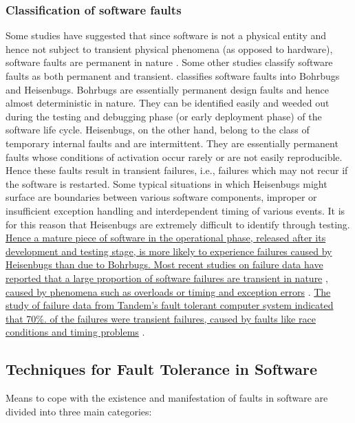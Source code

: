 \documentclass[a4paper, 11pt]{article}
\begin{document}

\subsubsection{Classification of software faults}
Some studies have suggested that since software is not a physical entity and hence not subject to transient physical phenomena (as opposed to hardware), software faults are permanent in nature \citep{huang1994two}. Some other studies classify software faults as both permanent and transient. \citet{gray1986computers} classifies software faults into Bohrbugs and Heisenbugs. Bohrbugs are essentially permanent design faults and hence almost deterministic in nature. They can be identified easily and weeded out during the testing and debugging phase (or early deployment phase) of the software life cycle. Heisenbugs, on the other hand, belong to the class of temporary internal faults and are intermittent. They are essentially permanent faults whose conditions of activation occur rarely or are not easily reproducible. Hence these faults result in transient failures, i.e., failures which may not recur if the software is restarted. Some typical situations in which Heisenbugs might surface are boundaries between various software components, improper or insufficient exception handling and interdependent timing of various events. It is for this reason that Heisenbugs are extremely difficult to identify through testing. \ul{Hence a mature piece of software in the operational phase, released after its development and testing stage, is more likely to experience failures caused by Heisenbugs than due to Bohrbugs. Most recent studies on failure data have reported that a large proportion of software failures are transient in nature} \citep{gray1986computers, gray1990census}, \ul{caused by phenomena such as overloads or timing and exception errors} \citep{chillarege1995measurement, sullivan1991software}. \ul{The study of failure data from Tandem's fault tolerant computer system indicated that 70\%. of the failures were transient failures, caused by faults like race conditions and timing problems} \citep{lee1994software, lee1995software}.

\subsection{Techniques for Fault Tolerance in Software}
Means to cope with the existence and manifestation of faults in software are divided into three main categories:
\end{document}
